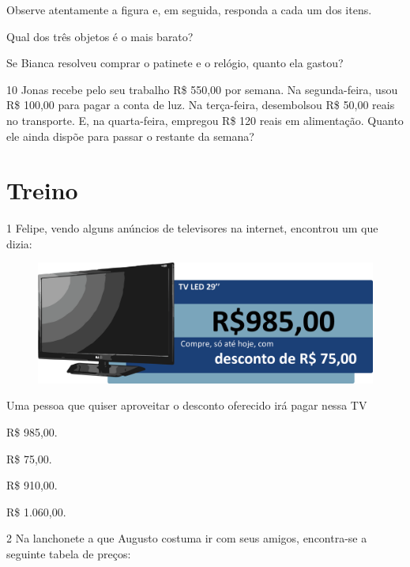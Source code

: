 Observe atentamente a figura e, em seguida, responda a cada um dos itens.

\begin{escolha}
\item Qual dos três objetos é o mais barato?

\item Se Bianca resolveu comprar o patinete e o relógio, quanto ela gastou?
\end{escolha}

\num{10} Jonas recebe pelo seu trabalho R\$ 550,00 por semana. Na segunda-feira, usou R\$ 100,00 para pagar a conta de luz. Na terça-feira, desembolsou R\$ 50,00 reais no transporte. E, na quarta-feira, empregou R\$ 120 reais em alimentação. Quanto ele ainda dispõe para passar o restante da semana?

\pagebreak
\section*{Treino}

\num{1} Felipe, vendo alguns anúncios de televisores na internet, encontrou um que dizia:

\begin{figure}[htpb!]
\centering
\includegraphics[width=.8\textwidth]{./media/image73.png}
\end{figure}

Uma pessoa que quiser aproveitar o desconto oferecido irá pagar nessa TV

\begin{escolha}
\item
  R\$ 985,00.
\item
  R\$ 75,00.
\item
  R\$ 910,00.
\item
  R\$ 1.060,00.
\end{escolha}

\num{2} Na lanchonete a que Augusto costuma ir com seus amigos, encontra-se a
seguinte tabela de preços:

